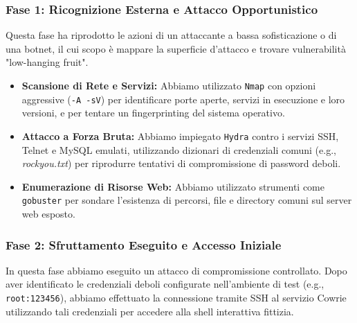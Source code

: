 \subsubsection{Fase 1: Ricognizione Esterna e Attacco Opportunistico}
Questa fase ha riprodotto le azioni di un attaccante a bassa sofisticazione o di una botnet, il cui scopo è mappare la superficie d'attacco e trovare vulnerabilità "low-hanging fruit".
\begin{itemize}
    \item \textbf{Scansione di Rete e Servizi:} Abbiamo utilizzato \texttt{Nmap} con opzioni aggressive (\texttt{-A -sV}) per identificare porte aperte, servizi in esecuzione e loro versioni, e per tentare un fingerprinting del sistema operativo.
    \item \textbf{Attacco a Forza Bruta:} Abbiamo impiegato \texttt{Hydra} contro i servizi SSH, Telnet e MySQL emulati, utilizzando dizionari di credenziali comuni (e.g., \textit{rockyou.txt}) per riprodurre tentativi di compromissione di password deboli.
    \item \textbf{Enumerazione di Risorse Web:} Abbiamo utilizzato strumenti come \texttt{gobuster} per sondare l'esistenza di percorsi, file e directory comuni sul server web esposto.
\end{itemize}

\subsubsection{Fase 2: Sfruttamento Eseguito e Accesso Iniziale}
In questa fase abbiamo eseguito un attacco di compromissione controllato. Dopo aver identificato le credenziali deboli configurate nell'ambiente di test (e.g., \texttt{root:123456}), abbiamo effettuato la connessione tramite SSH al servizio Cowrie utilizzando tali credenziali per accedere alla shell interattiva fittizia.

